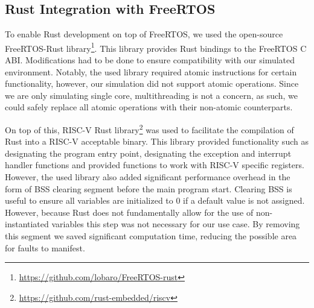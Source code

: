 \subsection{Rust Integration with FreeRTOS}

To enable Rust development on top of FreeRTOS, we used the open-source FreeRTOS-Rust library\footnote{\url{https://github.com/lobaro/FreeRTOS-rust}}. This library provides Rust bindings to the FreeRTOS C ABI. Modifications had to be done to ensure compatibility with our simulated environment. Notably, the used library required atomic instructions for certain functionality, however, our simulation did not support atomic operations. Since we are only simulating single core, multithreading is not a concern, as such, we could safely replace all atomic operations with their non-atomic counterparts.

On top of this, RISC-V Rust library\footnote{\url{https://github.com/rust-embedded/riscv}} was used to facilitate the compilation of Rust into a RISC-V acceptable binary. This library provided functionality such as designating the program entry point, designating the exception and interrupt handler functions and provided functions to work with RISC-V specific registers. However, the used library also added significant performance overhead in the form of BSS clearing segment before the main program start. Clearing BSS is useful to ensure all variables are initialized to 0 if a default value is not assigned. However, because Rust does not fundamentally allow for the use of non-instantiated variables this step was not necessary for our use case. By removing this segment we saved significant computation time, reducing the possible area for faults to manifest.